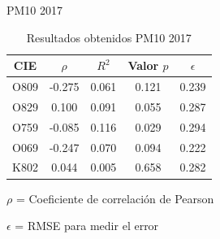 \documentclass[11pt]{beamer}
\begin{document}
\begin{frame}{PM10 2017}
\begin{table}[hbt!]
\centering
\caption{Resultados obtenidos PM10 2017}
\label{tab:Resultados obtenidos PM10 2017}
\vspace{0.5cm}
\begin{tabular}{|c|c|c|c|c|}
	\hline
	CIE & $\rho$ & $R^2$ & Valor $p$ & $\epsilon$\\
	\hline
	O809 & -0.275 & 0.061 & 0.121 & 0.239 \\
	\hline
	O829 & 0.100 & 0.091 & 0.055 & 0.287 \\
	\hline
	O759 & -0.085 & 0.116 & 0.029 & 0.294 \\
	\hline
	O069 & -0.247 & 0.070 & 0.094 & 0.222 \\
	\hline
	K802 & 0.044 & 0.005 & 0.658 & 0.282 \\
	\hline
\end{tabular}
\footnotesize
\item{$\rho$ = Coeficiente de correlación de Pearson}
\item{$\epsilon$ = RMSE para medir el error}
\end{table}
\end{frame}
\end{document}

